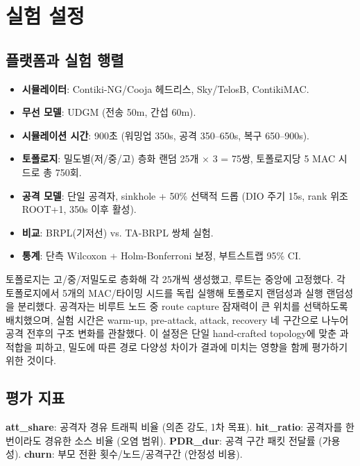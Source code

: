 \documentclass[10pt,a4paper,twocolumn]{article}
\begin{document}
\section{실험 설정}
\label{sec:setup}

\subsection{플랫폼과 실험 행렬}

\begin{itemize}\setlength{\itemsep}{1pt}
  \item \textbf{시뮬레이터}: Contiki-NG/Cooja 헤드리스, Sky/TelosB, ContikiMAC.
  \item \textbf{무선 모델}: UDGM (전송 50m, 간섭 60m).
  \item \textbf{시뮬레이션 시간}: 900초 (워밍업 350s, 공격 350--650s, 복구 650--900s).
  \item \textbf{토폴로지}: 밀도별(저/중/고) 층화 랜덤 25개 $\times$ 3 = 75쌍, 토폴로지당 5 MAC 시드로 총 750회.
  \item \textbf{공격 모델}: 단일 공격자, sinkhole + 50\% 선택적 드롭
    (DIO 주기 15s, rank 위조 ROOT+1, 350s 이후 활성).
  \item \textbf{비교}: BRPL(기저선) vs. TA-BRPL 쌍체 실험.
  \item \textbf{통계}: 단측 Wilcoxon + Holm-Bonferroni 보정, 부트스트랩 95\% CI.
\end{itemize}

토폴로지는 고/중/저밀도로 층화해 각 25개씩 생성했고,
루트는 중앙에 고정했다.
각 토폴로지에서 5개의 MAC/타이밍 시드를 독립 실행해
토폴로지 랜덤성과 실행 랜덤성을 분리했다.
공격자는 비루트 노드 중 route capture 잠재력이 큰 위치를 선택하도록 배치했으며,
실험 시간은 warm-up, pre-attack, attack, recovery 네 구간으로 나누어
공격 전후의 구조 변화를 관찰했다.
이 설정은 단일 hand-crafted topology에 맞춘 과적합을 피하고,
밀도에 따른 경로 다양성 차이가 결과에 미치는 영향을 함께 평가하기 위한 것이다.

\subsection{평가 지표}

\textbf{att\_share}: 공격자 경유 트래픽 비율 (의존 강도, 1차 목표).
\textbf{hit\_ratio}: 공격자를 한 번이라도 경유한 소스 비율 (오염 범위).
\textbf{PDR\_dur}: 공격 구간 패킷 전달률 (가용성).
\textbf{churn}: 부모 전환 횟수/노드/공격구간 (안정성 비용).
\end{document}
